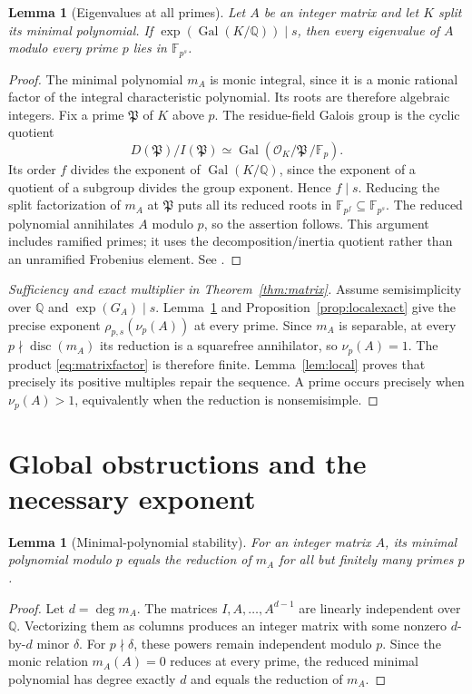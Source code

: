 \documentclass[11pt]{article}
\newtheorem{lemma}[theorem]{Lemma}
\theoremstyle{remark}
\newcommand{\disc}{\operatorname{disc}}
\newcommand{\Gal}{\operatorname{Gal}}
\newcommand{\F}{\mathbb F}
\newcommand{\Q}{\mathbb Q}
\begin{document}
\begin{lemma}[Eigenvalues at all primes]\label{lem:residue}
Let $A$ be an integer matrix and let $K$ split its minimal polynomial. If $\exp(\Gal(K/\Q))\mid s$, then every eigenvalue of $A$ modulo every prime $p$ lies in $\F_{p^s}$.
\end{lemma}
\begin{proof}
The minimal polynomial $m_A$ is monic integral, since it is a monic rational factor of the integral characteristic polynomial. Its roots are therefore algebraic integers. Fix a prime $\mathfrak P$ of $K$ above $p$. The residue-field Galois group is the cyclic quotient
\[
 D(\mathfrak P)/I(\mathfrak P)
       \simeq\Gal(\mathcal O_K/\mathfrak P\,/\F_p).
\]
Its order $f$ divides the exponent of $\Gal(K/\Q)$, since the exponent of a quotient of a subgroup divides the group exponent. Hence $f\mid s$. Reducing the split factorization of $m_A$ at $\mathfrak P$ puts all its reduced roots in $\F_{p^f}\subseteq\F_{p^s}$. The reduced polynomial annihilates $A$ modulo $p$, so the assertion follows. This argument includes ramified primes; it uses the decomposition/inertia quotient rather than an unramified Frobenius element. See \cite[Section~8]{Milne}.
\end{proof}

\begin{proof}[Sufficiency and exact multiplier in Theorem~\ref{thm:matrix}]
Assume semisimplicity over $\Q$ and $\exp(G_A)\mid s$. Lemma~\ref{lem:residue} and Proposition~\ref{prop:localexact} give the precise exponent $\rho_{p,s}(\nu_p(A))$ at every prime. Since $m_A$ is separable, at every $p\nmid\disc(m_A)$ its reduction is a squarefree annihilator, so $\nu_p(A)=1$. The product \eqref{eq:matrixfactor} is therefore finite. Lemma~\ref{lem:local} proves that precisely its positive multiples repair the sequence. A prime occurs precisely when $\nu_p(A)>1$, equivalently when the reduction is nonsemisimple.
\end{proof}

\section{Global obstructions and the necessary exponent}
\begin{lemma}[Minimal-polynomial stability]\label{lem:stability}
For an integer matrix $A$, its minimal polynomial modulo $p$ equals the reduction of $m_A$ for all but finitely many primes $p$.
\end{lemma}
\begin{proof}
Let $d=\deg m_A$. The matrices $I,A,\ldots,A^{d-1}$ are linearly independent over $\Q$. Vectorizing them as columns produces an integer matrix with some nonzero $d$-by-$d$ minor $\delta$. For $p\nmid\delta$, these powers remain independent modulo $p$. Since the monic relation $m_A(A)=0$ reduces at every prime, the reduced minimal polynomial has degree exactly $d$ and equals the reduction of $m_A$.
\end{proof}
\end{document}
